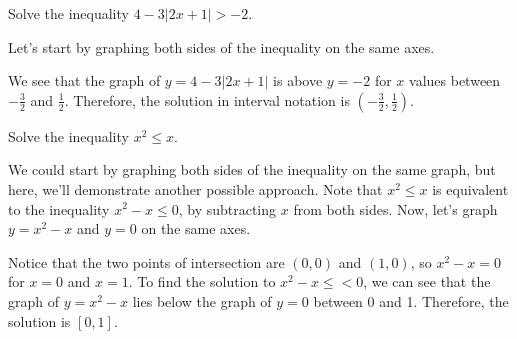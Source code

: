 \documentclass[noauthor, nooutcomes]{ximera}
\begin{document}
\begin{example}
Solve the inequality $4 - 3|2x + 1| > -2$.
\end{example}
\begin{explanation}
Let's start by graphing both sides of the inequality on the same axes. 
\begin{image}
\end{image}

We see that the graph of $y=4-3|2x+1|$ is above $y=-2$ for $x$ values between $-\frac{3}{2}$ and $\frac{1}{2}$. Therefore, the solution in interval notation is $\left(-\frac{3}{2}, \frac{1}{2}\right)$.
\end{explanation}

\begin{example}
Solve the inequality $x^2 \le x$.
\end{example}
\begin{explanation}
We could start by graphing both sides of the inequality on the same graph, but here, we'll demonstrate another possible approach. Note that $x^2 \le x$ is equivalent to the inequality $x^2 - x \le 0$, by subtracting $x$ from both sides. Now, let's graph $y = x^2 - x$ and $y = 0$ on the same axes.

\begin{image}
\end{image}

Notice that the two points of intersection are $(0, 0)$ and $(1, 0)$, so $x^2 - x = 0$ for $x = 0$ and $x = 1$. To find the solution to $x^2 - x \le < 0$, we can see that the graph of $y = x^2 - x$ lies below the graph of $y = 0$ between 0 and 1. Therefore, the solution is $[0, 1]$. 
\end{explanation}
\end{document}
